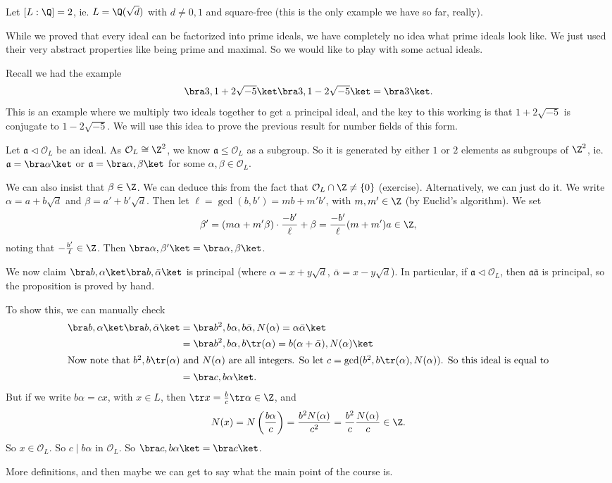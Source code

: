 \documentclass[a4paper]{article}
\begin{document}
\begin{eg}
  Let $[L:\Q] = 2$, ie. $L = \Q(\sqrt{d})$ with $d \not= 0, 1$ and square-free (this is the only example we have so far, really).

  While we proved that every ideal can be factorized into prime ideals, we have completely no idea what prime ideals look like. We just used their very abstract properties like being prime and maximal. So we would like to play with some actual ideals.

  Recall we had the example
  \[
    \bra 3, 1 + 2\sqrt{-5}\ket \bra 3, 1 - 2\sqrt{-5}\ket = \bra 3\ket.
  \]
  This is an example where we multiply two ideals together to get a principal ideal, and the key to this working is that $1 + 2\sqrt{-5}$ is conjugate to $1 - 2\sqrt{-5}$. We will use this idea to prove the previous result for number fields of this form.

  Let $\mathfrak{a} \lhd \mathcal{O}_L$ be an ideal. As $\mathcal{O}_L \cong \Z^2$, we know $\mathfrak{a} \leq \mathcal{O}_L$ as a subgroup. So it is generated by either $1$ or $2$ elements as subgroups of $\Z^2$, ie. $\mathfrak{a} = \bra \alpha\ket$ or $\mathfrak{a} = \bra \alpha, \beta\ket$ for some $\alpha, \beta \in \mathcal{O}_L$.

  We can also insist that $\beta \in \Z$. We can deduce this from the fact that $\mathcal{O}_L \cap \Z \not= \{0\}$ (exercise). Alternatively, we can just do it. We write $\alpha = a + b \sqrt{d}$ and $\beta = a' + b' \sqrt{d}$. Then let $\ell = \gcd(b, b') = mb + m' b'$, with $m, m' \in \Z$ (by Euclid's algorithm). We set
  \[
    \beta' = (m\alpha + m'\beta) \cdot \frac{-b'}{\ell} + \beta = \frac{-b'}{\ell}(m + m')a\in \Z,
  \]
  noting that $-\frac{b'}{\ell} \in \Z$. Then $\bra \alpha, \beta'\ket = \bra \alpha, \beta\ket$.

  We now claim $\bra b, \alpha\ket \bra b, \bar{\alpha}\ket$ is principal (where $\alpha = x +y \sqrt{d}$, $\bar{\alpha} = x - y \sqrt{d}$). In particular, if $\mathfrak{a} \lhd \mathcal{O}_L$, then $\mathfrak{a} \bar{\mathfrak{a}}$ is principal, so the proposition is proved by hand.

  To show this, we can manually check
  \begin{align*}
    \bra b, \alpha\ket \bra b, \bar{\alpha}\ket &= \bra b^2, b\alpha, b\bar{\alpha}, N(\alpha) = \alpha\bar{\alpha}\ket\\
    &= \bra b^2, b\alpha, b\tr(\alpha) = b(\alpha + \bar{\alpha}), N(\alpha)\ket\\
    \intertext{Now note that $b^2, b\tr(\alpha)$ and $N(\alpha)$ are all integers. So let $c = \gcd(b^2, b\tr(\alpha), N(\alpha))$. So this ideal is equal to}
    &= \bra c, b\alpha\ket.
  \end{align*}
  But if we write $b\alpha = cx$, with $x \in L$, then $\tr x = \frac{b}{c} \tr \alpha \in \Z$, and
  \[
    N(x) = N\left(\frac{b\alpha}{c}\right) = \frac{b^2 N(\alpha)}{c^2} = \frac{b^2}{c} \frac{N(\alpha)}{c} \in \Z.
  \]
  So $x \in \mathcal{O}_L$. So $c \mid b\alpha$ in $\mathcal{O}_L$. So $\bra c, b\alpha\ket = \bra c\ket$.
\end{eg}
More definitions, and then maybe we can get to say what the main point of the course is.
\end{document}
